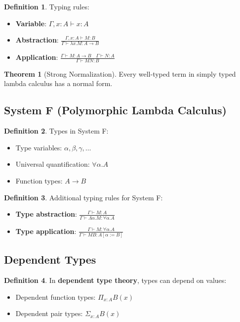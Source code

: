 \documentclass[11pt]{article}
\theoremstyle{definition}
\newtheorem{definition}{Definition}[section]
\newtheorem{theorem}{Theorem}[section]
\begin{document}
\begin{definition}
Typing rules:
\begin{itemize}
    \item \textbf{Variable}: $\Gamma, x:A \vdash x : A$
    \item \textbf{Abstraction}: $\frac{\Gamma, x:A \vdash M : B}{\Gamma \vdash \lambda x. M : A \to B}$
    \item \textbf{Application}: $\frac{\Gamma \vdash M : A \to B \quad \Gamma \vdash N : A}{\Gamma \vdash M N : B}$
\end{itemize}
\end{definition}

\begin{theorem}[Strong Normalization]
Every well-typed term in simply typed lambda calculus has a normal form.
\end{theorem}

\subsection{System F (Polymorphic Lambda Calculus)}
\begin{definition}
Types in System F:
\begin{itemize}
    \item Type variables: $\alpha, \beta, \gamma, \ldots$
    \item Universal quantification: $\forall \alpha. A$
    \item Function types: $A \to B$
\end{itemize}
\end{definition}

\begin{definition}
Additional typing rules for System F:
\begin{itemize}
    \item \textbf{Type abstraction}: $\frac{\Gamma \vdash M : A}{\Gamma \vdash \Lambda \alpha. M : \forall \alpha. A}$
    \item \textbf{Type application}: $\frac{\Gamma \vdash M : \forall \alpha. A}{\Gamma \vdash M B : A[\alpha := B]}$
\end{itemize}
\end{definition}

\subsection{Dependent Types}
\begin{definition}
In \textbf{dependent type theory}, types can depend on values:
\begin{itemize}
    \item Dependent function types: $\Pi_{x:A} B(x)$
    \item Dependent pair types: $\Sigma_{x:A} B(x)$
\end{itemize}
\end{definition}
\end{document}
